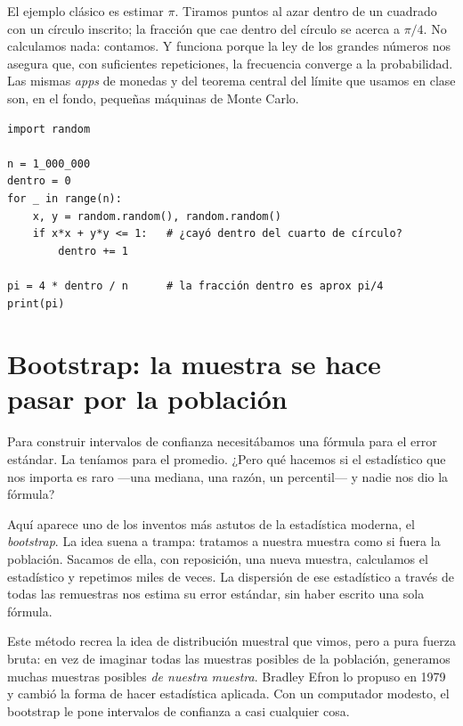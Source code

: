 El ejemplo clásico es estimar \(\pi\). Tiramos puntos al azar dentro de un cuadrado con un círculo inscrito; la fracción que cae dentro del círculo se acerca a \(\pi/4\). No calculamos nada: contamos. Y funciona porque la ley de los grandes números nos asegura que, con suficientes repeticiones, la frecuencia converge a la probabilidad. Las mismas \emph{apps} de monedas y del teorema central del límite que usamos en clase son, en el fondo, pequeñas máquinas de Monte Carlo.

\begin{lstlisting}
import random

n = 1_000_000
dentro = 0
for _ in range(n):
    x, y = random.random(), random.random()
    if x*x + y*y <= 1:   # ¿cayó dentro del cuarto de círculo?
        dentro += 1

pi = 4 * dentro / n      # la fracción dentro es aprox pi/4
print(pi)
\end{lstlisting}


\section{Bootstrap: la muestra se hace pasar por la población}

Para construir intervalos de confianza necesitábamos una fórmula para el error estándar. La teníamos para el promedio. ¿Pero qué hacemos si el estadístico que nos importa es raro —una mediana, una razón, un percentil— y nadie nos dio la fórmula?

Aquí aparece uno de los inventos más astutos de la estadística moderna, el \emph{bootstrap}. La idea suena a trampa: tratamos a nuestra muestra como si fuera la población. Sacamos de ella, con reposición, una nueva muestra, calculamos el estadístico y  repetimos miles de veces. La dispersión de ese estadístico a través de todas las remuestras nos estima su error estándar, sin haber escrito una sola fórmula.

Este método recrea la idea de distribución muestral que vimos, pero a pura fuerza bruta: en vez de imaginar todas las muestras posibles de la población, generamos muchas muestras posibles \emph{de nuestra muestra}. Bradley Efron lo propuso en 1979 y cambió la forma de hacer estadística aplicada. Con un computador modesto, el bootstrap le pone intervalos de confianza a casi cualquier cosa.

